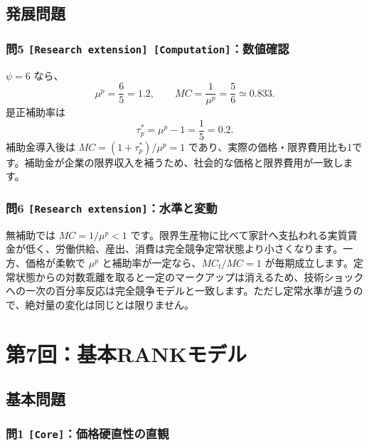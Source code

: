 \documentclass[
  japanese,
  lualatex,
  ja=standard,
  11pt,
  a4paper]{ltjsarticle}
\begin{document}
\subsection{発展問題}\label{ux767aux5c55ux554fux984c-5}

\subsubsection{\texorpdfstring{問5
\texttt{{[}Research\ extension{]}\ {[}Computation{]}}：数値確認}{問5 {[}Research extension{]} {[}Computation{]}：数値確認}}\label{ux554f5-research-extension-computationux6570ux5024ux78baux8a8d}

\(\psi=6\) なら、 \[
\mu^p=\frac65=1.2,
\qquad
MC=\frac1{\mu^p}=\frac56\simeq0.833.
\] 是正補助率は \[
\tau_p^*=\mu^p-1=\frac15=0.2.
\] 補助金導入後は \(MC=(1+\tau_p^*)/\mu^p=1\)
であり、実際の価格・限界費用比も1です。補助金が企業の限界収入を補うため、社会的な価格と限界費用が一致します。


\subsubsection{\texorpdfstring{問6
\texttt{{[}Research\ extension{]}}：水準と変動}{問6 {[}Research extension{]}：水準と変動}}\label{ux554f6-research-extensionux6c34ux6e96ux3068ux5909ux52d5}

無補助では \(MC=1/\mu^p<1\)
です。限界生産物に比べて家計へ支払われる実質賃金が低く、労働供給、産出、消費は完全競争定常状態より小さくなります。一方、価格が柔軟で
\(\mu^p\) と補助率が一定なら、\(MC_t/MC=1\)
が毎期成立します。定常状態からの対数乖離を取ると一定のマークアップは消えるため、技術ショックへの一次の百分率反応は完全競争モデルと一致します。ただし定常水準が違うので、絶対量の変化は同じとは限りません。

\clearpage

\section{第7回：基本RANKモデル}\label{ux7b2c7ux56deux57faux672crankux30e2ux30c7ux30eb}

\subsection{基本問題}\label{ux57faux672cux554fux984c-6}

\subsubsection{\texorpdfstring{問1
\texttt{{[}Core{]}}：価格硬直性の直観}{問1 {[}Core{]}：価格硬直性の直観}}\label{ux554f1-coreux4fa1ux683cux786cux76f4ux6027ux306eux76f4ux89b3}
\end{document}
